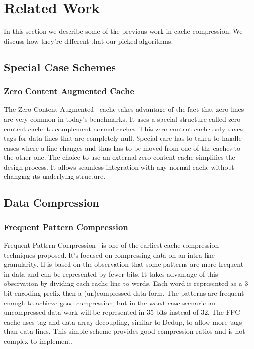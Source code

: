 
\chapter{Related Work}
\label{ch:Related Work}
In this section we describe some of the previous work in cache compression. We discuss how they're different that our picked algorithms.
\section{Special Case Schemes}
\subsection{Zero Content Augmented Cache}
The Zero Content Augmented~\cite{zca} cache takes advantage of the fact that zero lines are very common in today's benchmarks. It uses a special structure called zero content cache to complement normal caches. This zero content cache only saves tags for data lines that are completely null. Special care has to taken to handle cases where a line changes and thus has to be moved from one of the caches to the other one. The choice to use an external zero content cache simplifies the design process. It allows seamless integration with any normal cache without changing its underlying structure.

\section{Data Compression}
\subsection{Frequent Pattern Compression}
\label{ssec:FPC}
Frequent Pattern Compression~\cite{fpc} is one of the earliest cache compression techniques proposed. It's focused on compressing data on an intra-line granularity. If is based on the observation that some patterns are more frequent in data and can be represented by fewer bits. It takes advantage of this observation by dividing each cache line to words. Each word is represented as a 3-bit encoding prefix then a (un)compressed data form. The patterns are frequent enough to achieve good compression, but in the worst case scenario an uncompressed data work will be represented in 35 bits instead of 32. The FPC cache uses tag and data array decoupling, similar to Dedup, to allow more tags than data lines. This simple scheme provides good compression ratios and is not complex to implement.
